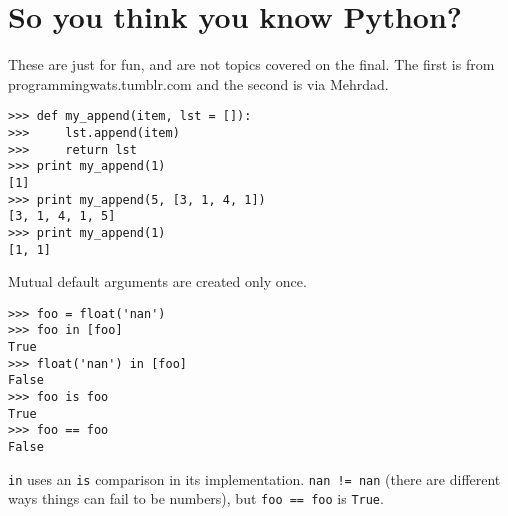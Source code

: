 \documentclass[11pt]{article}
\begin{document}
\section{So you think you know Python?}
\textnormal{These are just for fun, and are not topics covered on the final. The first is from programmingwats.tumblr.com and the second is via Mehrdad.}

\begin{verbatim}
>>> def my_append(item, lst = []):
>>>     lst.append(item)
>>>     return lst
>>> print my_append(1)
[1]
>>> print my_append(5, [3, 1, 4, 1])
[3, 1, 4, 1, 5]
>>> print my_append(1)
[1, 1]
\end{verbatim}
Mutual default arguments are created only once. 

\begin{verbatim}
>>> foo = float('nan')
>>> foo in [foo]
True
>>> float('nan') in [foo]
False
>>> foo is foo
True
>>> foo == foo
False
\end{verbatim}
\texttt{in} uses an \texttt{is} comparison in its implementation. \texttt{nan != nan} (there are different ways things can fail to be numbers), but \texttt{foo == foo} is \texttt{True}.
\end{document}
